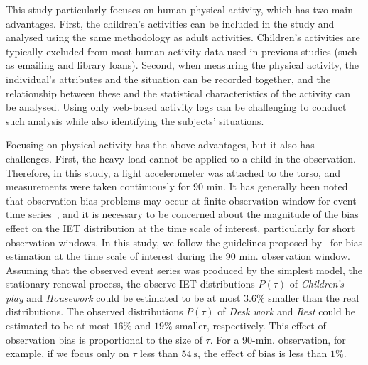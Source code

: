 \documentclass{bmcart}
\begin{document}

This study particularly focuses on human physical activity, which has two main advantages. First, the children's activities can be included in the study and analysed using the same methodology as adult activities. Children's activities are typically excluded from most human activity data used in previous studies (such as emailing and library loans).
Second, when measuring the physical activity, the individual's attributes and the situation can be recorded together, and the relationship between these and the statistical characteristics of the activity can be analysed. Using only web-based activity logs can be challenging to conduct such analysis while also identifying the subjects' situations.

Focusing on physical activity has the above advantages, but it also has challenges. First, the heavy load cannot be applied to a child in the observation. Therefore, in this study, a light accelerometer was attached to the torso, and measurements were taken continuously for 90 min. It has generally been noted that observation bias problems may occur at ﬁnite observation window for event time series~\cite{PhysRevE.92.052813}, and it is necessary to be concerned about the magnitude of the bias effect on the IET distribution at the time scale of interest, particularly for short observation windows.
In this study, we follow the guidelines proposed by~\cite{PhysRevE.92.052813} for bias estimation at the time scale of interest during the 90 min. observation window. %
Assuming that the observed event series was produced by the simplest model, the stationary renewal process, the observe IET distributions $P(\tau)$ of \textit{Children's play} and \textit{Housework} could be estimated to be at most $3.6\%$ smaller than the real distributions. The observed distributions $P(\tau)$ of \textit{Desk work} and \textit{Rest} could be estimated to be at most $16\%$ and $19\%$ smaller, respectively. This effect of observation bias is proportional to the size of $\tau$. For a 90-min. observation, for example, if we focus only on $\tau$ less than $54~\si{\second}$, the effect of bias is less than $1\%$.
\end{document}

